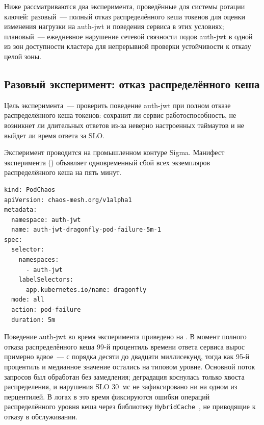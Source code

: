 Ниже рассматриваются два эксперимента,
проведённые для системы ротации ключей:
разовый~--- полный отказ распределённого кеша токенов
для оценки изменения нагрузки на auth-jwt
и поведения сервиса в этих условиях;
плановый~--- ежедневное нарушение сетевой связности подов auth-jwt
в одной из зон доступности кластера для непрерывной проверки
устойчивости к отказу целой зоны.

\subsection{Разовый эксперимент: отказ распределённого кеша}\label{subsec:ch4-chaos-cache}

Цель эксперимента~--- проверить поведение auth-jwt
при полном отказе распределённого кеша токенов:
сохранит ли сервис работоспособность,
не возникнет ли длительных ответов из-за неверно
настроенных таймаутов и не выйдет ли время ответа за SLO.

Эксперимент проводится на промышленном контуре Sigma.
Манифест эксперимента ()
объявляет одновременный сбой всех экземпляров распределённого
кеша на пять минут.

\begin{codeblock}
\begin{lstlisting}[]
kind: PodChaos
apiVersion: chaos-mesh.org/v1alpha1
metadata:
  namespace: auth-jwt
  name: auth-jwt-dragonfly-pod-failure-5m-1
spec:
  selector:
    namespaces:
      - auth-jwt
    labelSelectors:
      app.kubernetes.io/name: dragonfly
  mode: all
  action: pod-failure
  duration: 5m
\end{lstlisting}
\end{codeblock}

Поведение auth-jwt во время эксперимента приведено
на .
В момент полного отказа распределённого кеша
99-й процентиль времени ответа сервиса вырос примерно вдвое~---
с порядка десяти до двадцати миллисекунд,
тогда как 95-й процентиль и медианное значение
остались на типовом уровне.
Основной поток запросов был обработан без замедления;
деградация коснулась только хвоста распределения,
и нарушения SLO 30~мс не зафиксировано ни на одном из перцентилей.
В логах в это время фиксируются ошибки операций
распределённого уровня кеша через библиотеку
\texttt{HybridCache}~\cite{HybridCache},
не приводящие к отказу в обслуживании.


